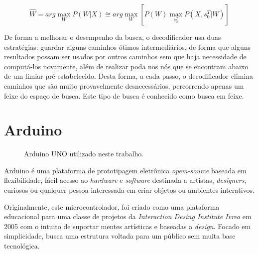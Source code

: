 \documentclass[12pt,a4paper,oneside]{report}
\begin{document}
\begin{equation}
\widehat{W} = arg \max _{W} P(W|X) \cong arg \max _{W} [P(W) \max _{s_{0}^{T}} P(X,s_{0}^{T}|W)]
\label{equ:viterbi}
\end{equation}

De forma a melhorar o desempenho da busca, o decodificador usa duas estratégias: guardar alguns caminhos ótimos intermediários, de forma que alguns resultados possam ser usados por outros caminhos sem que haja necessidade de computá-los novamente, além de realizar poda nos nós que se encontram abaixo de um limiar pré-estabelecido. Desta forma, a cada passo, o decodificador elimina caminhos que são muito provavelmente desnecessários, percorrendo apenas um feixe do espaço de busca. Este tipo de busca é conhecido como busca em feixe.

\section{Arduino}

\begin{figure}[h!]
\centering
{}\caption{Arduino UNO utilizado neste trabalho.}
\label{fig:arduino}
\end{figure}

Arduino \cite{arduino} é uma plataforma de prototipagem eletrônica \emph{opem-source} baseada em flexibilidade, fácil acesso ao \emph{hardware} e \emph{software} destinada a artistas, \emph{designers}, curiosos ou qualquer pessoa interessada em criar objetos ou ambientes interativos.

Originalmente, este microcontrolador, foi criado como uma plataforma educacional para uma classe de projetos da \emph{Interaction Desing Institute Ivrea} em 2005 com o intuito de suportar mentes artísticas e baseadas a \emph{design}. Focado em simplicidade, busca uma estrutura voltada para um público sem muita base tecnológica.
\end{document}
